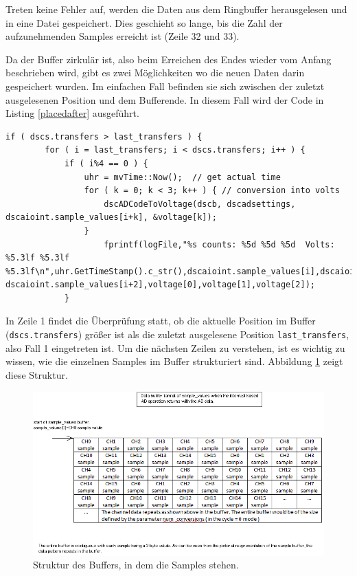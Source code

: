 \documentclass[12pt,a4paper,twoside,BCOR=12.5mm]{scrartcl}
\begin{document}
Treten keine Fehler auf, werden die Daten aus dem Ringbuffer herausgelesen und in eine Datei gespeichert.
Dies geschieht so lange, bis die Zahl der aufzunehmenden Samples erreicht ist (Zeile 32 und 33).

Da der Buffer zirkulär ist, also beim Erreichen des Endes wieder vom Anfang beschrieben wird, gibt es zwei Möglichkeiten wo die neuen Daten darin gespeichert wurden. Im einfachen Fall befinden sie sich zwischen der zuletzt ausgelesenen Position und dem Bufferende. In diesem Fall wird der Code in Listing \ref{placedafter} ausgeführt. 

\begin{lstlisting}[frame=trBL]
	if ( dscs.transfers > last_transfers ) {
		for ( i = last_transfers; i < dscs.transfers; i++ ) {
			if ( i%4 == 0 ) {
				uhr = mvTime::Now();  // get actual time
				for ( k = 0; k < 3; k++ ) { // conversion into volts
					dscADCodeToVoltage(dscb, dscadsettings, dscaioint.sample_values[i+k], &voltage[k]);
				}
					fprintf(logFile,"%s counts: %5d %5d %5d  Volts: %5.3lf %5.3lf %5.3lf\n",uhr.GetTimeStamp().c_str(),dscaioint.sample_values[i],dscaioint.sample_values[i+1], dscaioint.sample_values[i+2],voltage[0],voltage[1],voltage[2]);
			}
\end{lstlisting}		

In Zeile 1 findet die Überprüfung statt, ob die aktuelle Position im Buffer (\texttt{dscs.transfers}) größer ist als die zuletzt ausgelesene Position \texttt{last\_transfers}, also Fall 1 eingetreten ist. 
Um die nächsten Zeilen zu verstehen, ist es wichtig zu wissen, wie die einzelnen Samples im Buffer strukturiert sind. Abbildung \ref{samplebuffer} zeigt diese Struktur. 

\begin{figure}[H]
\centering
\includegraphics[scale=.55]{samplebuffer.png}
\caption{Struktur des Buffers, in dem die Samples stehen. \citep{Systems:2008uq}}
\label{samplebuffer}
\end{figure}
\end{document}
